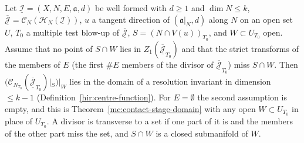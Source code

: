 \begin{theorem}
\label{mc:contact-stage-domain-masked}
\leanok
Let \(\underline{\mathcal I}=(X,N,E,\mathfrak a,d)\) be well formed with \(d\ge1\) and \(\dim N\le k\), \(\overline{\underline{\mathcal J}}=\mathcal C_N(\mathcal H_N(\underline{\mathcal I}))\), \(u\) a tangent
direction of \((\mathfrak a|_N,d)\) along \(N\) on an open set \(U\), \(T_0\) a multiple test blow-up of \(\overline{\underline{\mathcal J}}\), \(S=(N\cap V(u))_{T_0}\), and \(W\subset U_{T_0}\)
open. Assume that no point of \(S\cap W\) lies in \(Z_1(\overline{\underline{\mathcal J}}_{T_0})\) and that the strict transforms of the members of \(E\) (the first \(\#E\) members of
the divisor of \(\overline{\underline{\mathcal J}}_{T_0}\)) miss \(S\cap W\). Then \((\mathcal C_{N_{T_0}}(\overline{\underline{\mathcal J}}_{T_0})|_S)|_W\) lies in the domain of a resolution invariant in
dimension \(\le k-1\) (Definition~\ref{hir:centre-function}). For \(E=\emptyset\) the second assumption is empty, and this is Theorem~\ref{mc:contact-stage-domain} with
any open \(W\subset U_{T_0}\) in place of \(U_{T_0}\). A divisor is transverse to a set if one part of it is and the members of the other part miss the set, and \(S\cap W\) is a
closed submanifold of \(W\).
\end{theorem}
